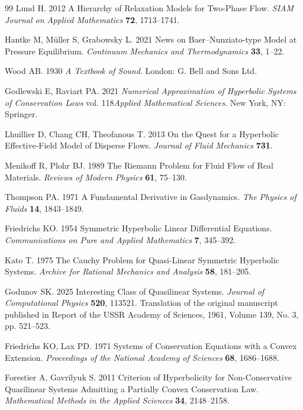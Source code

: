 \documentclass{myclass}
\begin{document}
\begin{thebibliography}{99}
Lund H. 2012  A {{Hierarchy}} of {{Relaxation Models}} for {{Two-Phase Flow}}.
  {\em SIAM Journal on Applied Mathematics} \textbf{72}, 1713--1741.

Hantke M, M{\"u}ller S, Grabowsky L. 2021  News on {{Baer}}--{{Nunziato-type}}
  Model at Pressure Equilibrium. {\em Continuum Mechanics and Thermodynamics}
  \textbf{33}, 1--22.

Wood AB. 1930 {\em A {{Textbook}} of {{Sound}}}.
London: {G. Bell and Sons Ltd.}

Godlewski E, Raviart PA. 2021 {\em Numerical {{Approximation}} of {{Hyperbolic
  Systems}} of {{Conservation Laws}}} vol. 118{\em Applied {{Mathematical
  Sciences}}}.
New York, NY: Springer.

Lhuillier D, Chang CH, Theofanous T. 2013  On the Quest for a Hyperbolic
  Effective-Field Model of Disperse Flows. {\em Journal of Fluid Mechanics}
  \textbf{731}.

Menikoff R, Plohr BJ. 1989  The {{Riemann}} Problem for Fluid Flow of Real
  Materials. {\em Reviews of Modern Physics} \textbf{61}, 75--130.

Thompson PA. 1971  A {{Fundamental Derivative}} in {{Gasdynamics}}. {\em The
  Physics of Fluids} \textbf{14}, 1843--1849.

Friedrichs KO. 1954  Symmetric Hyperbolic Linear Differential Equations. {\em
  Communications on Pure and Applied Mathematics} \textbf{7}, 345--392.

Kato T. 1975  The {{Cauchy}} Problem for Quasi-Linear Symmetric Hyperbolic
  Systems. {\em Archive for Rational Mechanics and Analysis} \textbf{58},
  181--205.

Godunov SK. 2025  Interesting Class of Quasilinear Systems. {\em Journal of
  Computational Physics} \textbf{520}, 113521.
Translation of the original manuscript published in Report of the USSR Academy
  of Sciences, 1961, Volume 139, No. 3, pp. 521–523.

Friedrichs KO, Lax PD. 1971  Systems of {{Conservation Equations}} with a
  {{Convex Extension}}. {\em Proceedings of the National Academy of Sciences}
  \textbf{68}, 1686--1688.

Forestier A, Gavrilyuk S. 2011  Criterion of Hyperbolicity for Non-Conservative
  Quasilinear Systems Admitting a Partially Convex Conservation Law. {\em
  Mathematical Methods in the Applied Sciences} \textbf{34}, 2148--2158.


\end{thebibliography}
\end{document}
